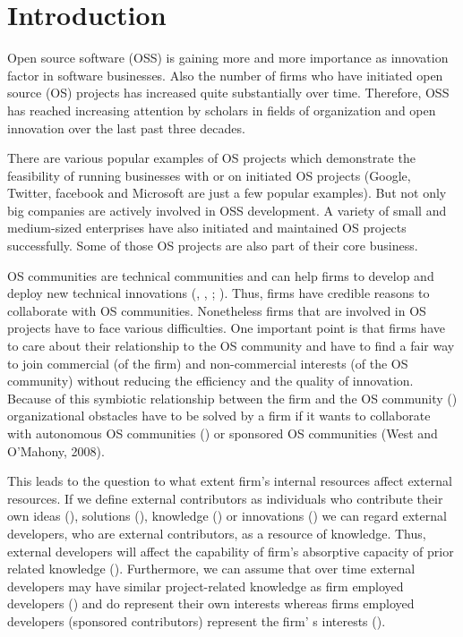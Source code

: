 \section{Introduction}

Open source software (OSS) is gaining more and more importance as innovation factor in software businesses. Also the number of firms who have initiated open source (OS) projects has increased quite substantially over time. Therefore, OSS has reached increasing attention by scholars in fields of organization and open innovation over the last past three decades.

There are various popular examples of OS projects  which demonstrate the feasibility of running businesses with or on initiated OS projects (Google, Twitter, facebook and Microsoft are just a few popular examples). But not only big companies are actively involved in OSS development. A variety of small and medium-sized enterprises have also initiated and maintained OS projects successfully. Some of those OS projects are also part of their core business.

OS communities are technical communities and can help firms to develop and deploy new technical innovations (\cite{rosenkopf2001bottom}, \cite{rosenkopf1998coevolution}, \cite{simcoe2006public}; \cite{fleming2007brokerage}). Thus, firms have credible reasons to collaborate with OS communities. Nonetheless firms that are involved in OS projects have to face various difficulties. One important point is that firms have to care about their relationship to the OS community and have to find a fair way to join commercial (of the firm) and non-commercial interests (of the OS community) without reducing the efficiency and the quality of innovation. Because of this symbiotic relationship between the firm and the OS community (\cite{dahlander2005relationships}) organizational obstacles have to be solved by a firm if it wants to collaborate with autonomous OS communities (\cite{piezunka2013study}) or sponsored OS communities (West and O’Mahony, 2008).

This leads to the question to what extent firm's internal resources affect external resources. If we define external contributors as individuals who contribute their own ideas (\cite{piller2006toolkits}), solutions (\cite{jeppesen2010marginality}), knowledge (\cite{laursen2006open}) or innovations (\cite{urban1988lead}) we can regard external developers, who are external contributors, as a resource of knowledge. Thus, external developers will affect the capability of firm's absorptive capacity of prior related knowledge (\cite{cohen1990absorptive}). Furthermore, we can assume that over time external developers may have similar project-related knowledge as firm employed developers (\cite{piezunka2013study}) and do represent their own interests whereas firms employed developers (sponsored contributors) represent the firm’ s interests (\cite{dahlander2006man}).

